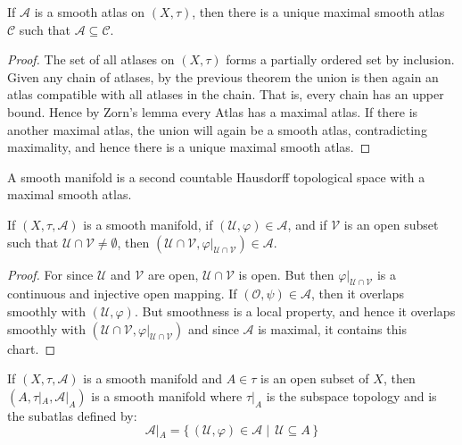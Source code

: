     \begin{theorem}
        If $\mathcal{A}$ is a smooth atlas on $(X,\tau)$, then there is a
        unique maximal smooth atlas $\mathcal{C}$ such that
        $\mathcal{A}\subseteq\mathcal{C}$.
    \end{theorem}
    \begin{proof}
        The set of all atlases on $(X,\tau)$ forms a partially ordered set
        by inclusion. Given any chain of atlases, by the previous theorem
        the union is then again an atlas compatible with all atlases in the
        chain. That is, every chain has an upper bound. Hence by Zorn's
        lemma every Atlas has a maximal atlas. If there is another maximal
        atlas, the union will again be a smooth atlas, contradicting
        maximality, and hence there is a unique maximal smooth atlas.
    \end{proof}
    A smooth manifold is a second countable Hausdorff topological space with
    a maximal smooth atlas.
    \begin{theorem}
        If $(X,\tau,\mathcal{A})$ is a smooth manifold, if
        $(\mathcal{U},\varphi)\in\mathcal{A}$, and if $\mathcal{V}$ is an
        open subset such that $\mathcal{U}\cap\mathcal{V}\ne\emptyset$, then
        $(\mathcal{U}\cap\mathcal{V},%
         \varphi|_{\mathcal{U}\cap\mathcal{V}})\in\mathcal{A}$.
    \end{theorem}
    \begin{proof}
        For since $\mathcal{U}$ and $\mathcal{V}$ are open,
        $\mathcal{U}\cap\mathcal{V}$ is open. But then
        $\varphi|_{\mathcal{U}\cap\mathcal{V}}$ is a continuous and
        injective open mapping. If $(\mathcal{O},\psi)\in\mathcal{A}$, then
        it overlaps smoothly with $(\mathcal{U},\varphi)$. But smoothness
        is a local property, and hence it overlaps smoothly with
        $(\mathcal{U}\cap\mathcal{V},\varphi|_{\mathcal{U}\cap\mathcal{V}})$
        and since $\mathcal{A}$ is maximal, it contains this chart.
    \end{proof}
    \begin{theorem}
        If $(X,\tau,\mathcal{A})$ is a smooth manifold and $A\in\tau$ is an
        open subset of $X$, then $(A,\tau|_{A},\mathcal{A}|_{A})$ is a
        smooth manifold where $\tau|_{A}$ is the subspace topology and
        is the subatlas defined by:
        \begin{equation}
            \mathcal{A}|_{A}=
            \{\,(\mathcal{U},\varphi)\in\mathcal{A}\;|\;\,
                \mathcal{U}\subseteq{A}\,\}
        \end{equation}
    \end{theorem}
